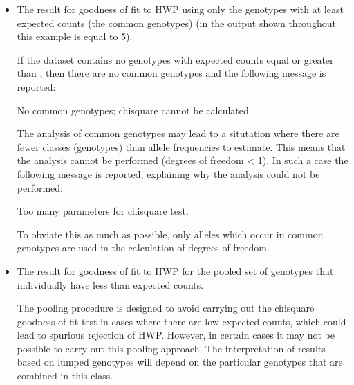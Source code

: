 \documentclass[letterpaper,10pt,english,openany,oneside]{sphinxmanual}
\begin{document}
\begin{itemize}
\item {} 
\sphinxAtStartPar
{}

\sphinxAtStartPar
The result for goodness of fit to HWP using only the genotypes with
at least  expected counts (the common genotypes) (in the
output shown throughout this example  is equal to 5).

\sphinxAtStartPar
If the dataset contains no genotypes with expected counts equal or
greater than , then there are no common genotypes and
the following message is reported:

\begin{sphinxVerbatim}[commandchars=\\\{\}]
No common genotypes; chi\PYGZhy{}square cannot be calculated
\end{sphinxVerbatim}

\sphinxAtStartPar
The analysis of common genotypes may lead to a situtation where there
are fewer classes (genotypes) than allele frequencies to estimate.
This means that the analysis cannot be performed (degrees of freedom
\textless{} 1). In such a case the following message is reported, explaining
why the analysis could not be performed:

\begin{sphinxVerbatim}[commandchars=\\\{\}]
Too many parameters for chi\PYGZhy{}square test.
\end{sphinxVerbatim}

\sphinxAtStartPar
To obviate this as much as possible, only alleles which occur in
common genotypes are used in the calculation of degrees of freedom.

\item {} 
\sphinxAtStartPar
{}

\sphinxAtStartPar
The result for goodness of fit to HWP for the pooled set of genotypes
that individually have less than  expected counts.

\sphinxAtStartPar
The pooling procedure is designed to avoid carrying out the
chi\sphinxhyphen{}square goodness of fit test in cases where there are low expected
counts, which could lead to spurious rejection of HWP. However, in
certain cases it may not be possible to carry out this pooling
approach. The interpretation of results based on lumped genotypes
will depend on the particular genotypes that are combined in this
class.


\end{itemize}
\end{document}
